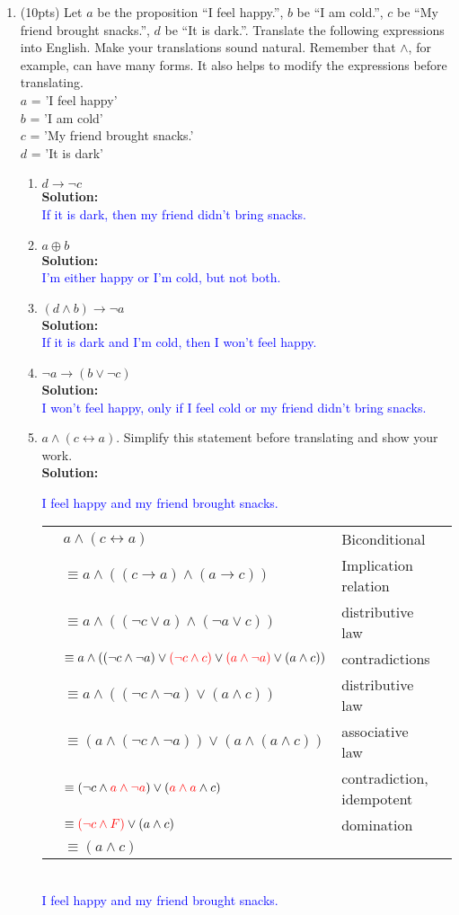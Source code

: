 \documentclass{article}
\renewcommand{\implies}{\rightarrow}
\newcommand{\xor}{\oplus}
\newcommand{\sol}[1]{\textbf{Solution:\,}\textcolor{blue}{#1}}
\begin{document}
\begin{enumerate}
\newpage

\item(10pts) Let $a$ be the proposition ``I feel happy.'', $b$ be ``I am cold.'', $c$ be ``My friend brought snacks.'', $d$ be ``It is dark.''.
Translate the following expressions into English. Make your translations sound natural. Remember that $\land$, for example, can have many forms. It also helps to modify the expressions before translating.
\\$a$ = 'I feel happy'
\\$b$ = 'I am cold'
\\$c$ = 'My friend brought snacks.'
\\$d$ = 'It is dark'
\begin{enumerate}
\item $d \implies \neg c$
\\\sol{\\If it is dark, then my friend didn't bring snacks.}
\item $a \xor b$
\\\sol{\\I'm either happy or I'm cold, but not both.}
\item $(d \land b )\implies \neg a$
\\\sol{\\If it is dark and I'm cold, then I won't feel happy.}
\item $\neg a \implies (b \lor \neg c)$
\\\sol{\\I won't feel happy, only if I feel cold or my friend didn't bring snacks.}
\item $a  \land (c \leftrightarrow a)$. Simplify this statement before translating and show your work.
\\\sol{I feel happy and my friend brought snacks.
\\\begin{tabular}{llll}
&\quad $a\land (c \leftrightarrow a)$&Biconditional\\
&$\equiv a \land ((c \implies a) \land (a \implies c))$&Implication relation\\
&$\equiv a \land ((\neg c \lor a) \land (\neg a \lor c))$ &distributive law\\
&$\equiv a \land ((\neg c \land \neg a) \lor \textcolor{red}{ (\neg c \land c)} \lor\textcolor{red}{ (a \land \neg a)}\lor (a \land c))$ & contradictions\\
&$\equiv a \land ((\neg c \land \neg a) \lor (a \land c))$ & distributive law\\
&$\equiv (a \land(\neg c \land \neg a)) \lor(a \land (a \land c))$ & associative law\\
&$\equiv (\neg c \land \textcolor{red}{a \land \neg a} ) \lor(\textcolor{red}{a \land a} \land c)$& contradiction, idempotent\\
&$\equiv \textcolor{red}{(\neg c \land F)} \lor(a \land c)$ & domination\\
&$\equiv (a \land c)$\\
\end{tabular}
\\I feel happy and my friend brought snacks.}
\end{enumerate}


\end{enumerate}
\end{document}
